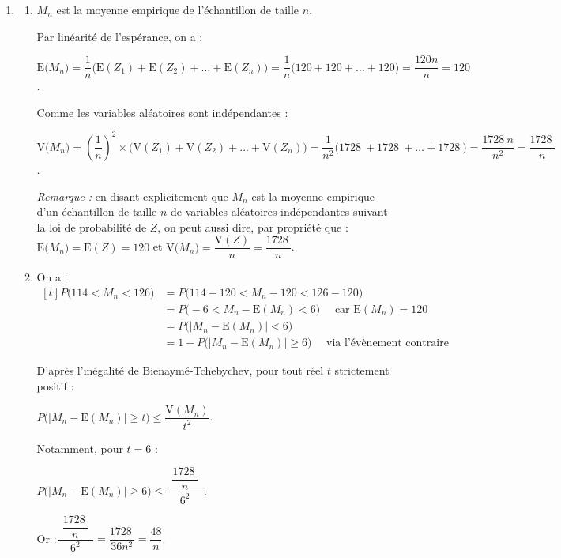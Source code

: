 \documentclass[10pt]{article}
\providecommand{\np}[2][]{{#2~#1}}
\begin{document}
\begin{enumerate}
		\item \begin{enumerate}
			\item $M_{n}$ est la moyenne empirique de l'échantillon de taille $n$.

			Par linéarité de l'espérance, on a :

			$\mathrm{E}\big(M_{n}\big) = \dfrac{1}{n} \big(\mathrm{E}(Z_1) + \mathrm{E}(Z_2) + \dots + \mathrm{E}(Z_n)\big) = \dfrac{1}{n}\big(120 + 120 + \dots + 120\big) = \dfrac{120n}{n} = 120$.

			Comme les variables aléatoires sont indépendantes :

			$\mathrm{V}\big(M_{n}\big) = \left(\dfrac{1}{n}\right)^2 \times \big(\mathrm{V}(Z_1) + \mathrm{V}(Z_2) + \dots + \mathrm{V}(Z_n)\big) = \dfrac{1}{n^2}\big(\np{1728} + \np{1728} + \dots + \np{1728}\big) = \dfrac{\np{1728}n}{n^2} = \dfrac{\np{1728}}{n}$.

			\emph{Remarque :} en disant explicitement que $M_n$ est la moyenne empirique d'un échantillon de taille $n$ de variables aléatoires indépendantes suivant la loi de probabilité de $Z$, on peut aussi dire, par propriété que :
			\quad
			$\mathrm{E}\big(M_{n}\big) = \mathrm{E}(Z)= 120$ \quad et \quad $\mathrm{V}\big(M_{n}\big) = \dfrac{\mathrm{V}(Z)}{n}= \dfrac{\np{1728}}{n}$.

			\item On a :\quad $\begin{aligned}[t]
				P\big(114 < M_n < 126\big)
					&= P\big(114 - 120 < M_n - 120 < 126 - 120\big) \\
					&= P\big(-6 < M_n - \mathrm{E}(M_n) < 6\big)\quad \text{ car } \mathrm{E}(M_n)= 120\\
					&= P\big(\big|M_n - \mathrm{E}(M_n)\big| < 6\big)\\
					&= 1 - P\big(\big|M_n - \mathrm{E}(M_n)\big| \geqslant 6\big) \quad \text{ via l'évènement contraire}
			\end{aligned}$

			D'après l'inégalité de Bienaymé-Tchebychev, pour tout réel $t$ strictement positif :

			$P\big(\big|M_n - \mathrm{E}(M_n)\big| \geqslant t\big) \leqslant \dfrac{\mathrm{V}(M_n)}{t^2}$.

			Notamment, pour $t = 6$ :

			$P\big(\big|M_n - \mathrm{E}(M_n)\big| \geqslant 6\big) \leqslant \dfrac{~~\dfrac{\np{1728}}{n}~~}{6^2}$.

			Or :\quad $\dfrac{~~\dfrac{\np{1728}}{n}~~}{6^2} = \dfrac{\np{1728}}{36n^2} = \dfrac{48}{n}$.


\end{enumerate}
\end{enumerate}
\end{document}
